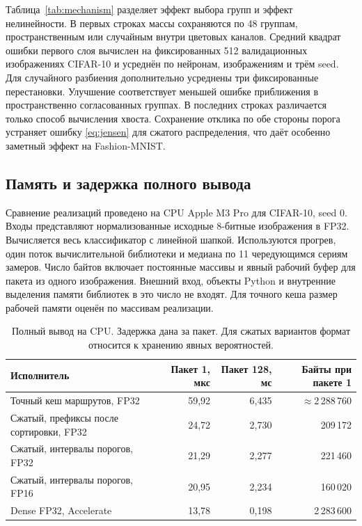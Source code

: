 \documentclass[11pt,a4paper]{article}
\begin{document}
Таблица~\ref{tab:mechanism} разделяет эффект выбора групп и эффект нелинейности. В первых строках массы сохраняются по 48 группам, пространственным или случайным внутри цветовых каналов. Средний квадрат ошибки первого слоя вычислен на фиксированных 512 валидационных изображениях CIFAR-10 и усреднён по нейронам, изображениям и трём seed. Для случайного разбиения дополнительно усреднены три фиксированные перестановки. Улучшение соответствует меньшей ошибке приближения в пространственно согласованных группах. В последних строках различается только способ вычисления хвоста. Сохранение отклика по обе стороны порога устраняет ошибку \eqref{eq:jensen} для сжатого распределения, что даёт особенно заметный эффект на Fashion-MNIST.

\subsection{Память и задержка полного вывода}
Сравнение реализаций проведено на CPU Apple M3 Pro для CIFAR-10, seed 0. Входы представляют нормализованные исходные 8-битные изображения в FP32. Вычисляется весь классификатор с линейной шапкой. Используются прогрев, один поток вычислительной библиотеки и медиана по 11 чередующимся сериям замеров. Число байтов включает постоянные массивы и явный рабочий буфер для пакета из одного изображения. Внешний вход, объекты Python и внутренние выделения памяти библиотек в это число не входят. Для точного кеша размер рабочей памяти оценён по массивам реализации.

\begin{table}[htbp]
\centering
\caption{Полный вывод на CPU. Задержка дана за пакет. Для сжатых вариантов формат относится к хранению явных вероятностей.}
\label{tab:systems}
\small
\begin{tabularx}{\textwidth}{@{}Yrrr@{}}
\toprule
Исполнитель & Пакет 1, мкс & Пакет 128, мс & Байты при пакете 1 \\
\midrule
Точный кеш маршрутов, FP32 & 59,92 & 6,435 & $\approx$2\,288\,760 \\
Сжатый, префиксы после сортировки, FP32 & 24,72 & 2,730 & 209\,172 \\
Сжатый, интервалы порогов, FP32 & 21,29 & 2,277 & 221\,460 \\
Сжатый, интервалы порогов, FP16 & 20,95 & 2,234 & 160\,020 \\
Dense FP32, Accelerate & 13,78 & 0,198 & 2\,283\,600 \\
\bottomrule
\end{tabularx}
\end{table}
\end{document}
